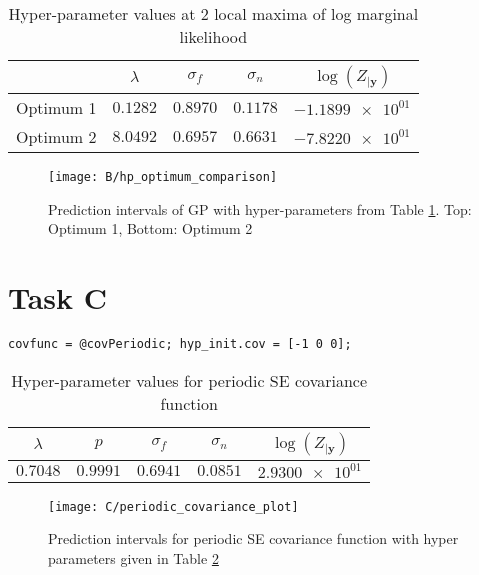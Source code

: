 \documentclass[11pt]{article}
\begin{document}
\begin{table}[h]
    \centering
    \begin{tabular}{|c|c|c|c|c|}
        \hline
         & $\lambda$ & $\sigma_f$ & $\sigma_n$ & $\log(Z_{|\textbf{y}})$ \\
        \hline
        Optimum 1 & $0.1282$ & $0.8970$ & $0.1178$ & $\num{-1.1899e+01}$ \\ 
        Optimum 2 & $8.0492$ & $0.6957$ & $0.6631$ & $\num{-7.8220e+01}$ \\ 
        \hline
    \end{tabular}
    \caption{Hyper-parameter values at 2 local maxima of log marginal likelihood}
    \label{table:B_hyper_parameter_optima}
\end{table}

\begin{figure}[h]
    \centering
    \texttt{[image: B/hp\_optimum\_comparison]}
    \caption{Prediction intervals of GP with hyper-parameters from Table \ref{table:B_hyper_parameter_optima}. Top: Optimum 1, Bottom: Optimum 2}
    \label{fig:B_hyper_parameter_optimum_comparison}
\end{figure}

\section{Task C}
\begin{lstlisting}[caption=Code to use periodic SE covariance. Training and prediction code same as Listing \ref{lst:A}, captionpos=b, basicstyle=\small]
covfunc = @covPeriodic; hyp_init.cov = [-1 0 0];
\end{lstlisting}
\label{lst:C}


\begin{table}[h]
    \centering
    \begin{tabular}{|c|c|c|c|c|}
        \hline
        $\lambda$ & $p$ & $\sigma_f$ & $\sigma_n$ & $\log(Z_{|\textbf{y}})$ \\
        \hline
        $0.7048$ & $0.9991$ & $0.6941$ & $0.0851$ & $\num{2.9300e+01}$ \\ 
        \hline
    \end{tabular}
    \caption{Hyper-parameter values for periodic SE covariance function}
    \label{table:C_periodic_covariance_hyper_parameters}
\end{table}

\begin{figure}[h]
    \centering
    \texttt{[image: C/periodic\_covariance\_plot]}
    \caption{Prediction intervals for periodic SE covariance function with hyper parameters given in Table \ref{table:C_periodic_covariance_hyper_parameters}}
    \label{fig:B_periodic_covariance_prediction_intervals}
\end{figure}
\end{document}
